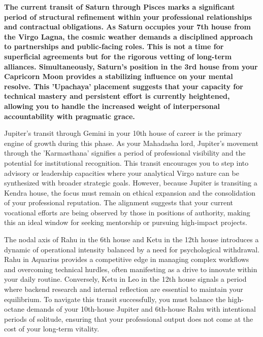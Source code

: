
\label{topic57}

{\fontsize{9.5}{13.8}\selectfont\bfseries\color{DeepSlate} The current transit of Saturn through Pisces marks a significant period of structural refinement within your professional relationships and contractual obligations. As Saturn occupies your 7th house from the Virgo Lagna, the cosmic weather demands a disciplined approach to partnerships and public-facing roles. This is not a time for superficial agreements but for the rigorous vetting of long-term alliances. Simultaneously, Saturn's position in the 3rd house from your Capricorn Moon provides a stabilizing influence on your mental resolve. This 'Upachaya' placement suggests that your capacity for technical mastery and persistent effort is currently heightened, allowing you to handle the increased weight of interpersonal accountability with pragmatic grace.}\par\vspace{2mm}

{\fontsize{9}{13}\selectfont Jupiter's transit through Gemini in your 10th house of career is the primary engine of growth during this phase. As your Mahadasha lord, Jupiter's movement through the 'Karmasthana' signifies a period of professional visibility and the potential for institutional recognition. This transit encourages you to step into advisory or leadership capacities where your analytical Virgo nature can be synthesized with broader strategic goals. However, because Jupiter is transiting a Kendra house, the focus must remain on ethical expansion and the consolidation of your professional reputation. The alignment suggests that your current vocational efforts are being observed by those in positions of authority, making this an ideal window for seeking mentorship or pursuing high-impact projects.}\par\vspace{1.8mm}

{\fontsize{9}{13}\selectfont The nodal axis of Rahu in the 6th house and Ketu in the 12th house introduces a dynamic of operational intensity balanced by a need for psychological withdrawal. Rahu in Aquarius provides a competitive edge in managing complex workflows and overcoming technical hurdles, often manifesting as a drive to innovate within your daily routine. Conversely, Ketu in Leo in the 12th house signals a period where backend research and internal reflection are essential to maintain your equilibrium. To navigate this transit successfully, you must balance the high-octane demands of your 10th-house Jupiter and 6th-house Rahu with intentional periods of solitude, ensuring that your professional output does not come at the cost of your long-term vitality.}\par\vspace{1.8mm}

